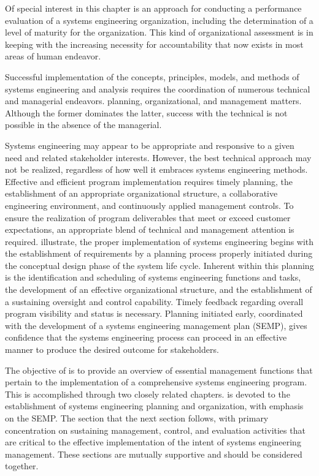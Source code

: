 Of special interest in this chapter is an approach for conducting a performance evaluation of a systems engineering organization, including the determination of a level of maturity for the organization. This kind of organizational assessment is in keeping with the increasing necessity for accountability that now exists in most areas of human endeavor.

Successful implementation of the concepts, principles, models, and methods of systems engineering and analysis requires the coordination of numerous technical and managerial endeavors. planning, organizational, and management matters. Although the former dominates the latter, success with the technical is not possible in the absence of the managerial.

Systems engineering may appear to be appropriate and responsive to a given need and related stakeholder interests. However, the best technical approach may not be realized, regardless of how well it embraces systems engineering methods. Effective and efficient program implementation requires timely planning, the establishment of an appropriate organizational structure, a collaborative engineering environment, and continuously applied management controls. To ensure the realization of program deliverables that meet or exceed customer expectations, an appropriate blend of technical and management attention is required. illustrate, the proper implementation of systems engineering begins with the establishment of requirements by a planning process properly initiated during the conceptual design phase of the system life cycle. Inherent within this planning is the identification and scheduling of systems engineering functions and tasks, the development of an effective organizational structure, and the establishment of a sustaining oversight and control capability. Timely feedback regarding overall program visibility and status is necessary. Planning initiated early, coordinated with the development of a systems engineering management plan (SEMP), gives confidence that the systems engineering process can proceed in an effective manner to produce the desired outcome for stakeholders.

The objective of is to provide an overview of essential management functions that pertain to the implementation of a comprehensive systems engineering program. This is accomplished through two closely related chapters. is devoted to the establishment of systems engineering planning and organization, with emphasis on the SEMP. The section that the next section follows, with primary concentration on sustaining management, control, and evaluation activities that are critical to the effective implementation of the intent of systems engineering management. These sections are mutually supportive and should be considered together.
